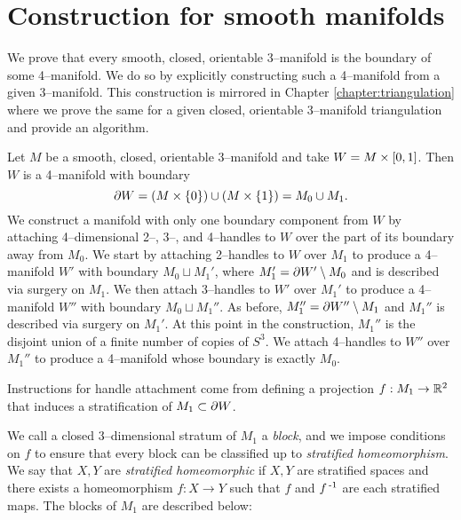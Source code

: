 \chapter{Construction for smooth manifolds}
\label{chapter:smooth}

We prove that every smooth, closed, orientable 3--manifold is the boundary of some 4--manifold.
We do so by explicitly constructing such a 4--manifold from a given 3--manifold.
This construction is mirrored in Chapter \ref{chapter:triangulation} where we prove the same for a given closed, orientable 3--manifold triangulation and provide an algorithm.

Let $M$ be a smooth, closed, orientable 3--manifold and take $W=M\times [0,1]$.
Then $W$ is a 4--manifold with boundary
\[
	\partial W = (M\times\{0\}) \cup (M\times\{1\}) = M_0 \cup M_1.
\]
We construct a manifold with only one boundary component from $W$ by attaching 4--dimensional 2--, 3--, and 4--handles to $W$ over the part of its boundary away from $M_0$.
We start by attaching 2--handles to $W$ over $M_1$ to produce a 4--manifold $W'$ with boundary $M_0 \sqcup M_1'$, where $M_1'=\partial W'\setminus M_0$ and is described via surgery on $M_1$.
We then attach 3--handles to $W'$ over $M_1'$ to produce a 4--manifold $W''$ with boundary $M_0\sqcup M_1''$.
As before, $M_1''=\partial W''\setminus M_1$ and $M_1''$ is described via surgery on $M_1'$.
At this point in the construction, $M_1''$ is the disjoint union of a finite number of copies of $S^3$.
We attach 4--handles to $W''$ over $M_1''$ to produce a 4--manifold whose boundary is exactly $M_0$.

Instructions for handle attachment come from defining a projection $f:M_1\to \mathbb{R}^2$ that induces a stratification of $M_1\subset\partial W$.

%
%
We call a closed 3--dimensional stratum of $M_1$ a \emph{block}, and we impose conditions on $f$ to ensure that every block can be classified up to \emph{stratified homeomorphism}.
We say that $X,Y$ are \emph{stratified homeomorphic} if $X,Y$ are stratified spaces and there exists a homeomorphism $f:X\to Y$ such that $f$ and $f^{\,\text{-}1}$ are each stratified maps.
The blocks of $M_1$ are described below:

